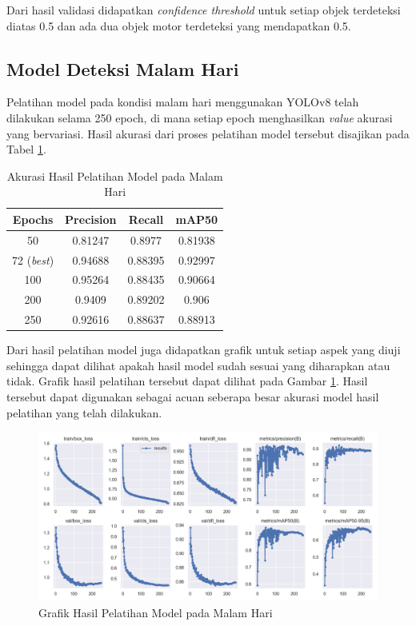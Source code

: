 Dari hasil validasi didapatkan \emph{confidence threshold} untuk setiap objek terdeteksi diatas 0.5 dan ada dua objek motor terdeteksi yang mendapatkan 0.5.

\subsection{Model Deteksi Malam Hari}
Pelatihan model pada kondisi malam hari menggunakan YOLOv8 telah dilakukan selama 250 epoch, di mana setiap epoch menghasilkan \emph{value} akurasi yang bervariasi. Hasil akurasi dari proses pelatihan model tersebut disajikan pada Tabel \ref{table:akurasi model malam}.
\begin{table}[H]
	\caption{Akurasi Hasil Pelatihan Model pada Malam Hari}
    \label{table:akurasi model malam}
	\centering
	\begin{tabular}{|c|c|c|c|}
		\hline
		Epochs & Precision & Recall & mAP50 \\ \hline
		50 & 0.81247 & 0.8977 & 0.81938 \\ \hline
        72 (\emph{best}) & 0.94688 & 0.88395 & 0.92997 \\ \hline
		100 & 0.95264 & 0.88435 & 0.90664 \\ \hline
		200 & 0.9409 & 0.89202 & 0.906 \\ \hline
		250 & 0.92616 & 0.88637 & 0.88913 \\ \hline
	\end{tabular}
\end{table}

Dari hasil pelatihan model juga didapatkan grafik untuk setiap aspek yang diuji sehingga dapat dilihat apakah hasil model sudah sesuai yang diharapkan atau tidak. Grafik hasil pelatihan tersebut dapat dilihat pada Gambar \ref{fig:grafik model malam}. Hasil tersebut dapat digunakan sebagai acuan seberapa besar akurasi model hasil pelatihan yang telah dilakukan.

\begin{figure} [H] \centering
  \includegraphics[scale=0.5]{bab4/grafik_model_malam.png}
  \caption{Grafik Hasil Pelatihan Model pada Malam Hari}
  \label{fig:grafik model malam}
\end{figure}

